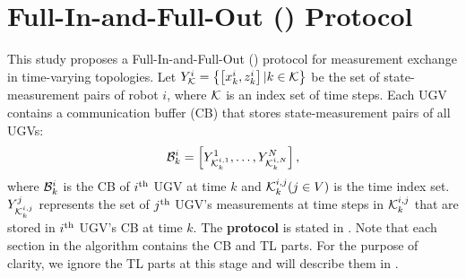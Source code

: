 \section{Full-In-and-Full-Out (\proto) Protocol}\label{sec:\proto}	
	This study proposes a Full-In-and-Full-Out (\proto) protocol for measurement exchange in time-varying topologies.
	Let $Y^i_{\mathcal{K}}=\left\lbrace \left[x^i_k,z^i_k\right]|k\in \mathcal{K}\right\rbrace$ 
	be the set of state-measurement pairs of robot $i$, where $\mathcal{K}$ is an index set of time steps.
	Each UGV contains a communication buffer (CB) that stores state-measurement pairs 
	of all UGVs:
	\small\begin{equation*}		
		\mathcal{B}^i_k=\left[ Y^1_{\mathcal{K}^{i,1}_k},\dots,Y^N_{\mathcal{K}^{i,N}_k}\right],
	\end{equation*}\normalsize
	where $\mathcal{B}^i_k$ is the CB of $i^\text{th}$ UGV at time $k$ and $\mathcal{K}^{i,j}_k (j\in V)$ is the time index set.
	$Y^j_{\mathcal{K}^{i,j}_k}$ represents the set of $j^\text{th}$ UGV's measurements at time steps in $\mathcal{K}^{i,j}_k$ that are stored in $i^\text{th}$ UGV's CB at time $k$.
	The \textbf{{\proto} protocol} is stated in .
	Note that each section in the algorithm contains the CB and TL parts.
	For the purpose of clarity, we ignore the TL parts at this stage and will describe them in .
	
